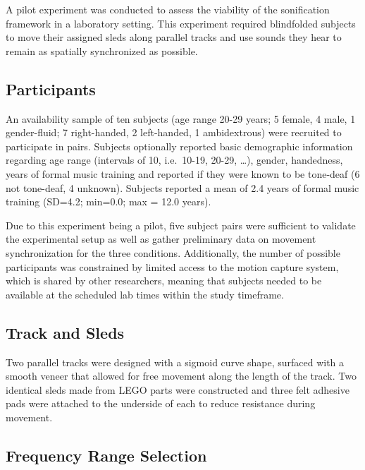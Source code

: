 \documentclass[10pt,a4paper,onecolumn]{article}
\begin{document}
A pilot experiment was conducted to assess the viability of the sonification framework in a laboratory setting. This experiment required blindfolded subjects to move their assigned sleds along parallel tracks and use sounds they hear to remain as spatially synchronized as possible.

\hypertarget{participants}{%
\subsection{Participants}\label{participants}}

An availability sample of ten subjects (age range 20-29 years; 5 female, 4 male, 1 gender-fluid; 7 right-handed, 2 left-handed, 1 ambidextrous) were recruited to participate in pairs. Subjects optionally reported basic demographic information regarding age range (intervals of 10, i.e.~10-19, 20-29, \ldots), gender, handedness, years of formal music training and reported if they were known to be tone-deaf (6 not tone-deaf, 4 unknown). Subjects reported a mean of 2.4 years of formal music training (SD=4.2; min=0.0; max = 12.0 years).

Due to this experiment being a pilot, five subject pairs were sufficient to validate the experimental setup as well as gather preliminary data on movement synchronization for the three conditions. Additionally, the number of possible participants was constrained by limited access to the motion capture system, which is shared by other researchers, meaning that subjects needed to be available at the scheduled lab times within the study timeframe.

\hypertarget{track-and-sleds}{%
\subsection{Track and Sleds}\label{track-and-sleds}}

Two parallel tracks were designed with a sigmoid curve shape, surfaced with a smooth veneer that allowed for free movement along the length of the track. Two identical sleds made from LEGO parts were constructed and three felt adhesive pads were attached to the underside of each to reduce resistance during movement.

\hypertarget{frequency-range-selection}{%
\subsection{Frequency Range Selection}\label{frequency-range-selection}}
\end{document}

